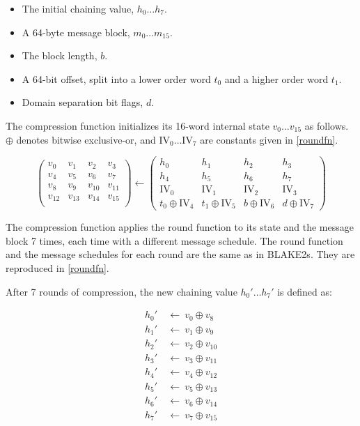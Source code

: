 \documentclass[11pt,notitlepage,a4paper]{article}
\newcommand{\IV}{\text{IV}}
\begin{document}
\begin{itemize}
    \item The initial chaining value, $h_{0} \ldots h_{7}$.
    \item A 64-byte message block, $m_{0} \ldots m_{15}$.
    \item The block length, $b$.
    \item A 64-bit offset, split into a lower order word $t_{0}$ and a higher
        order word $t_{1}$.
    \item Domain separation bit flags, $d$.
\end{itemize}

The compression function initializes its 16-word internal state $v_{0} \ldots
v_{15}$ as follows. $\oplus$ denotes bitwise exclusive-or, and $\IV_{0} \ldots
\IV_{7}$ are constants given in \ref{roundfn}.

\begin{equation*}
\begin{pmatrix}
v_{0} & v_{1} & v_{2} & v_{3} \\
v_{4} & v_{5} & v_{6} & v_{7} \\
v_{8} & v_{9} & v_{10} & v_{11} \\
v_{12} & v_{13} & v_{14} & v_{15} \\
\end{pmatrix}
\leftarrow
\begin{pmatrix}
h_{0} & h_{1} & h_{2} & h_{3} \\
h_{4} & h_{5} & h_{6} & h_{7} \\
\IV_{0} & \IV_{1} & \IV_{2} & \IV_{3} \\
t_{0} \oplus \IV_{4} & t_{1} \oplus \IV_{5} & b \oplus \IV_{6} & d \oplus \IV_{7}
\end{pmatrix}
\end{equation*}

The compression function applies the round function to its state and the
message block 7 times, each time with a different message schedule. The round
function and the message schedules for each round are the same as in BLAKE2s.
They are reproduced in \ref{roundfn}.

After 7 rounds of compression, the new chaining value $h_{0}' \ldots h_{7}'$ is
defined as:

\begin{align*}
    h_{0}' \ & \leftarrow \ v_{0} \oplus  v_{8} \\
    h_{1}' \ & \leftarrow \ v_{1} \oplus  v_{9} \\
    h_{2}' \ & \leftarrow \ v_{2} \oplus  v_{10} \\
    h_{3}' \ & \leftarrow \ v_{3} \oplus  v_{11} \\
    h_{4}' \ & \leftarrow \ v_{4} \oplus  v_{12} \\
    h_{5}' \ & \leftarrow \ v_{5} \oplus  v_{13} \\
    h_{6}' \ & \leftarrow \ v_{6} \oplus  v_{14} \\
    h_{7}' \ & \leftarrow \ v_{7} \oplus  v_{15}
\end{align*}
\end{document}
